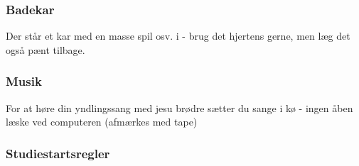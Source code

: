 \subsubsection{Badekar}
Der står et kar med en masse spil osv. i - brug det hjertens gerne, men læg det også pænt tilbage.


\subsubsection{Musik}
For at høre din yndlingssang med jesu brødre sætter du sange i kø - ingen åben læske ved computeren (afmærkes med tape)


\subsubsection{Studiestartsregler}

